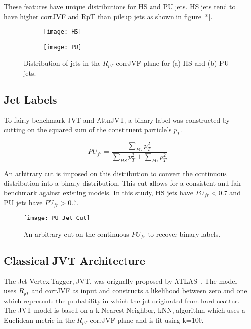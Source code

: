 These features have unique distributions for HS and PU jets. HS jets tend to have higher corrJVF and RpT than pileup jets as shown in figure [*]. \\

\begin{figure}[h!]
\centering
\begin{subfigure}{.25\textwidth}
  \centering
  \texttt{[image: HS]}
  \caption{}
  \label{fig:sub1}
\end{subfigure}%
\begin{subfigure}{.25\textwidth}
  \centering
  \texttt{[image: PU]}
  \caption{}
  \label{fig:sub2}
\end{subfigure}
\caption{Distribution of jets in the $R_{pT}$-corrJVF plane for (a) HS and (b) PU jets.}
\label{fig:test}
\end{figure}

\subsection{Jet Labels}\hfill

To fairly benchmark JVT and AttnJVT, a binary label was constructed by cutting on the squared sum of the constituent particle's $p_T$.

\begin{equation}
    PU_{fr} = \frac{\sum\limits_{PU} p_T^{2}}{\sum\limits_{HS} p_T^{2} + \sum\limits_{PU} p_T^{2}}
\end{equation}

An arbitrary cut is imposed on this distribution to convert the continuous distribution into a binary distribution. This cut allows for a consistent and fair benchmark against existing models. In this study, HS jets have $PU_{fr}<0.7$ and PU jets have $PU_{fr}>0.7$.

\begin{figure}[h]
\centering
\texttt{[image: PU\_Jet\_Cut]}
\caption{An arbitrary cut on the continuous $PU_{fr}$ to recover binary labels.}
\end{figure}

\subsection{Classical JVT Architecture}\hfill

The Jet Vertex Tagger, JVT, was orignally proposed by ATLAS~\cite{ATLAS-CONF-2014-018}. The model uses $R_{pT}$ and corrJVF as input and constructs a likelihood between zero and one which represents the probability in which the jet originated from hard scatter. The JVT model is based on a k-Nearest Neighbor, kNN, algorithm which uses a Euclidean metric in the $R_{pT}$-corrJVF plane and is fit using k=100.

